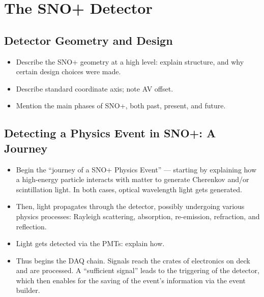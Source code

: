 
\chapter{The SNO+ Detector}\label{chap:detector}
\section{Detector Geometry and Design}
\begin{itemize}
    \item Describe the SNO+ geometry at a high level: explain structure, and why certain design choices were made.
    \item Describe standard coordinate axis; note AV offset.
    \item Mention the main phases of SNO+, both past, present, and future.
\end{itemize}
\section{Detecting a Physics Event in SNO+: A Journey}
\begin{itemize}
    \item Begin the ``journey of a SNO+ Physics Event'' --- starting by explaining how a high-energy particle interacts with matter to generate Cherenkov and/or scintillation light. In both cases, optical wavelength light gets generated.
    \item Then, light propagates through the detector, possibly undergoing various physics processes: Rayleigh scattering, absorption, re-emission, refraction, and reflection.
    \item Light gets detected via the PMTs: explain how.
    \item Thus begins the DAQ chain. Signals reach the crates of electronics on deck and are processed. A ``sufficient signal'' leads to the triggering of the detector, which then enables for the saving of the event's information via the event builder.
\end{itemize}
